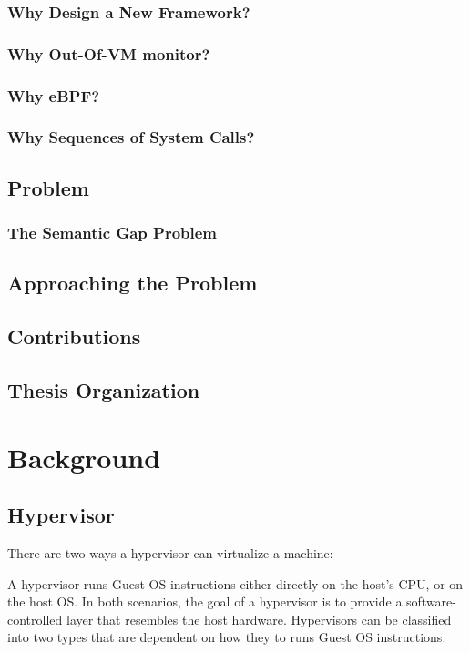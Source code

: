 \documentclass{report}
\begin{document}
\begin{spacing}{1.5}
\subsection{Why Design a New Framework?}
\subsection{Why Out-Of-VM monitor?}
\subsection{Why eBPF?}
\subsection{Why Sequences of System Calls?}

\section{Problem}
\subsection{The Semantic Gap Problem}
\section{Approaching the Problem}

\section{Contributions}

\section{Thesis Organization}

\chapter{Background}
\section{Hypervisor}

{\large
There are two ways a hypervisor can virtualize a machine:

A hypervisor runs Guest OS instructions either directly on the host's CPU, or on the host OS. In both scenarios, 
the goal of a hypervisor is to provide a software-controlled layer that resembles the host hardware. Hypervisors 
can be classified into two types that are dependent on how they to runs Guest OS instructions.
\newline
}


\end{spacing}
\end{document}
